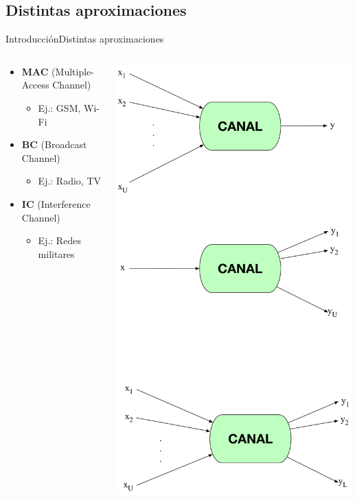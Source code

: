 \documentclass[10pt,compress]{beamer} %
\begin{document}
\subsection{Distintas aproximaciones}
\begin{frame}{Introducción}{Distintas aproximaciones}
  \begin{columns}[onlytextwidth]
    \begin{column}{.5\textwidth}
      \begin{itemize}
        \item {\bf MAC} (Multiple-Access Channel)
        \begin{itemize}
          \item Ej.: GSM, Wi-Fi
        \end{itemize}
        \vspace{1cm}
        \item {\bf BC} (Broadcast Channel)
        \begin{itemize}
          \item Ej.: Radio, TV
        \end{itemize}
        \vspace{1cm}
        \item {\bf IC} (Interference Channel)
        \begin{itemize}
          \item Ej.: Redes militares
        \end{itemize}
      \end{itemize}
    \end{column}
    \begin{column}{.5\textwidth}
      \includegraphics[width=0.6\linewidth]{../Apuntes/Figuras/ModosDeAcceso.pdf}
    \end{column}
  \end{columns}
\end{frame}
\end{document}
